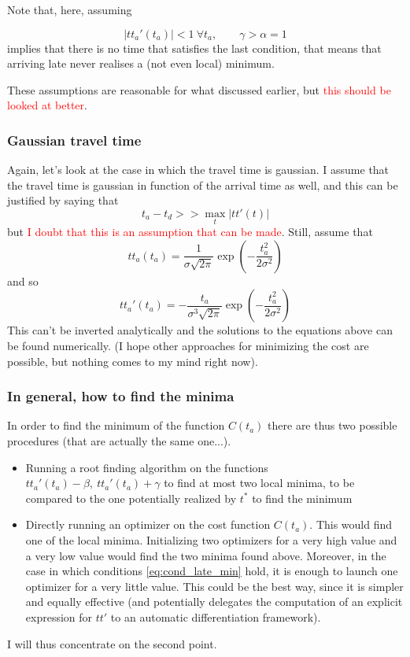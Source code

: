 \documentclass{article}
\begin{document}
Note that, here, assuming

\begin{equation}
  \label{eq:cond_late_min}
|tt_a'(t_a)| < 1 \ \forall t_a, \qquad \gamma > \alpha = 1
\end{equation}
implies that there is no time that satisfies the last condition, that means that arriving late never realises a (not even local) minimum.

These assumptions are reasonable for what discussed earlier, but \textcolor{red}{this should be looked at better}.

\subsubsection{Gaussian travel time}

Again, let's look at the case in which the travel time is gaussian.
I assume that the travel time is gaussian in function of the arrival time as well,
and this can be justified by saying that
\[t_a - t_d >> \max_t | tt'(t)|\]
but \textcolor{red}{I doubt that this is an assumption that can be made}.
Still, assume that
\begin{equation}
  \label{eq:travel_time_gauss}
  tt_a(t_a) = \frac{1}{\sigma\sqrt{2\pi}}\exp\left(-{\frac{t_a^2}{2\sigma^2}}\right)
\end{equation}
and so
\begin{equation}
  \label{eq:travel_time_gauss_diff}
  tt_a'(t_a) = -\frac{t_a}{\sigma^3\sqrt{2\pi}}\exp\left(-{\frac{t_a^2}{2\sigma^2}}\right)
\end{equation}
This can't be inverted analytically and the solutions to the equations above can be found numerically.
(I hope other approaches for minimizing the cost are possible, but nothing comes to my mind right now).

\subsubsection{In general, how to find the minima}


In order to find the minimum of the function \(C(t_a)\) there are thus two possible procedures (that are actually the same one...).
\begin{itemize}
\item Running a root finding algorithm on the functions \(tt_a'(t_a) - \beta,\ tt_a'(t_a) + \gamma\) to find at most two local minima, to be compared to the one potentially realized by \(t^*\) to find the minimum
\item Directly running an optimizer on the cost function \(C(t_a)\). This would find one of the local minima.
  Initializing two optimizers for a very high value and a very low value would find the two minima found above.
  Moreover, in the case in which conditions \eqref{eq:cond_late_min} hold,
  it is enough to launch one optimizer for a very little value.
  This could be the best way, since it is simpler and equally effective (and potentially delegates the computation of an explicit expression for \(tt'\) to an automatic differentiation framework).
\end{itemize}

I will thus concentrate on the second point.
\end{document}
